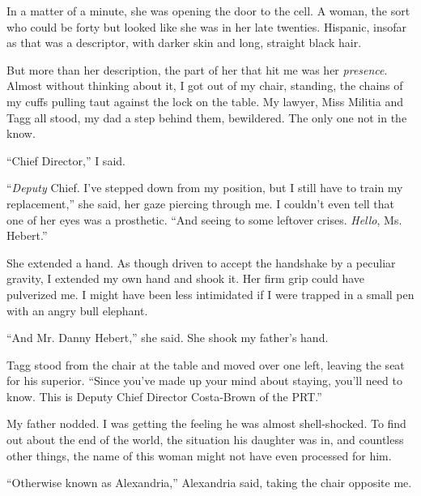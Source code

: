 In a matter of a minute, she was opening the door to the cell.  A woman, the sort who could be forty but looked like she was in her late twenties.  Hispanic, insofar as that was a descriptor, with darker skin and long, straight black hair.



But more than her description, the part of her that hit me was her \emph{presence}.  Almost without thinking about it, I got out of my chair, standing, the chains of my cuffs pulling taut against the lock on the table.  My lawyer, Miss Militia and Tagg all stood, my dad a step behind them, bewildered.  The only one not in the know.



``Chief Director,'' I said.



``\emph{Deputy }Chief.  I've stepped down from my position, but I still have to train my replacement,'' she said, her gaze piercing through me.  I couldn't even tell that one of her eyes was a prosthetic.  ``And seeing to some leftover crises.  \emph{Hello}, Ms. Hebert.''



She extended a hand.  As though driven to accept the handshake by a peculiar gravity, I extended my own hand and shook it.  Her firm grip could have pulverized me.  I might have been less intimidated if I were trapped in a small pen with an angry bull elephant.



``And Mr. Danny Hebert,'' she said.  She shook my father's hand.



Tagg stood from the chair at the table and moved over one left, leaving the seat for his superior.  ``Since you've made up your mind about staying, you'll need to know.  This is Deputy Chief Director Costa-Brown of the PRT.''



My father nodded.  I was getting the feeling he was almost shell-shocked.  To find out about the end of the world, the situation his daughter was in, and countless other things, the name of this woman might not have even processed for him.



``Otherwise known as Alexandria,'' Alexandria said, taking the chair opposite me.





